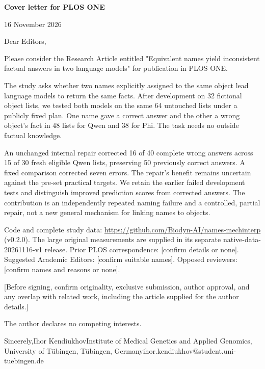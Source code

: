\documentclass[11pt,letterpaper]{article}
\begin{document}
{\Large\textbf{Cover letter for PLOS ONE}}\par\medskip

16 November 2026


Dear Editors,


Please consider the Research Article entitled "Equivalent names yield inconsistent factual answers in two language models" for publication in PLOS ONE.


The study asks whether two names explicitly assigned to the same object lead language models to return the same facts. After development on 32 fictional object lists, we tested both models on the same 64 untouched lists under a publicly fixed plan. One name gave a correct answer and the other a wrong object's fact in 48 lists for Qwen and 38 for Phi. The task needs no outside factual knowledge.


An unchanged internal repair corrected 16 of 40 complete wrong answers across 15 of 30 fresh eligible Qwen lists, preserving 50 previously correct answers. A fixed comparison corrected seven errors. The repair's benefit remains uncertain against the pre-set practical targets. We retain the earlier failed development tests and distinguish improved prediction scores from corrected answers. The contribution is an independently repeated naming failure and a controlled, partial repair, not a new general mechanism for linking names to objects.


Code and complete study data: \url{https://github.com/Biodyn-AI/names-mechinterp} (v0.2.0). The large original measurements are supplied in its separate native-data-20261116-v1 release. Prior PLOS correspondence: [confirm details or none]. Suggested Academic Editors: [confirm suitable names]. Opposed reviewers: [confirm names and reasons or none].


[Before signing, confirm originality, exclusive submission, author approval, and any overlap with related work, including the article supplied for the author details.]


The author declares no competing interests.


Sincerely,\newline Ihor Kendiukhov\newline Institute of Medical Genetics and Applied Genomics, University of Tübingen, Tübingen, Germany\newline ihor.kendiukhov@student.uni-tuebingen.de
\end{document}
